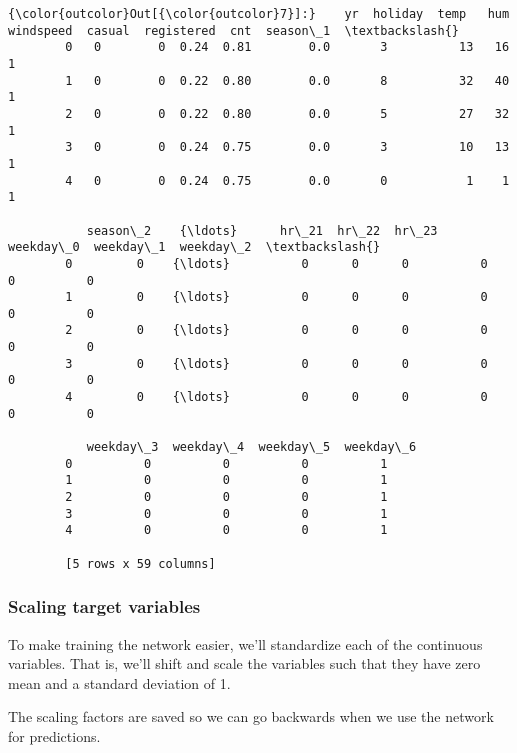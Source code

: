\documentclass[11pt]{article}
\begin{document}
\begin{Verbatim}[commandchars=\\\{\}]
{\color{outcolor}Out[{\color{outcolor}7}]:}    yr  holiday  temp   hum  windspeed  casual  registered  cnt  season\_1  \textbackslash{}
        0   0        0  0.24  0.81        0.0       3          13   16         1   
        1   0        0  0.22  0.80        0.0       8          32   40         1   
        2   0        0  0.22  0.80        0.0       5          27   32         1   
        3   0        0  0.24  0.75        0.0       3          10   13         1   
        4   0        0  0.24  0.75        0.0       0           1    1         1   
        
           season\_2    {\ldots}      hr\_21  hr\_22  hr\_23  weekday\_0  weekday\_1  weekday\_2  \textbackslash{}
        0         0    {\ldots}          0      0      0          0          0          0   
        1         0    {\ldots}          0      0      0          0          0          0   
        2         0    {\ldots}          0      0      0          0          0          0   
        3         0    {\ldots}          0      0      0          0          0          0   
        4         0    {\ldots}          0      0      0          0          0          0   
        
           weekday\_3  weekday\_4  weekday\_5  weekday\_6  
        0          0          0          0          1  
        1          0          0          0          1  
        2          0          0          0          1  
        3          0          0          0          1  
        4          0          0          0          1  
        
        [5 rows x 59 columns]
\end{Verbatim}
            
    \hypertarget{scaling-target-variables}{%
\subsubsection{Scaling target
variables}\label{scaling-target-variables}}

To make training the network easier, we'll standardize each of the
continuous variables. That is, we'll shift and scale the variables such
that they have zero mean and a standard deviation of 1.

The scaling factors are saved so we can go backwards when we use the
network for predictions.
\end{document}
